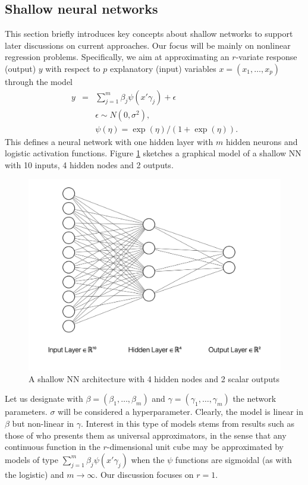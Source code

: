 \subsection{Shallow neural networks}
This section briefly introduces key concepts
about shallow networks to support later discussions on current approaches.
Our focus will be mainly on nonlinear regression 
problems. Specifically, we aim at approximating 
an $r$-variate response (output) $y$ with respect to $p$ explanatory 
(input) variables $x=(x_1,\ldots,x_p)$ through the 
model
\begin{eqnarray}\label{kantora}
  y         & = & \sum_{j=1}^m \beta_j \psi(x' \gamma_j) +
                    \epsilon %
                    \nonumber\\
              & & \epsilon \sim N(0,\sigma^2),
                  \nonumber \\
              & & \psi(\eta) = \exp(\eta)/(1+\exp(\eta)).
                  \end{eqnarray}
This defines a neural network with one hidden 
layer with $m$ hidden neurons and logistic 
activation functions.
Figure \ref{figuradkk1} sketches 
a graphical model of a shallow NN with 10 inputs, 4 hidden nodes and 
2 outputs. 
\begin{figure}
    \centering
    \includegraphics[scale=0.5]{figures/net1.png}
    \caption{A shallow NN architecture with 4 hidden nodes and 2 scalar outputs}
    \label{figuradkk1}
\end{figure}

Let us designate with $\beta=(\beta_1,\ldots,\beta_m)$ and $\gamma=(\gamma_1,\ldots,\gamma_m)$ the network parameters. $\sigma$  
will be considered a hyperparameter. Clearly, the model
is linear in $\beta$ but non-linear in  
$\gamma$. Interest in this type of models stems from 
results such as those of \parencite{cybenko1989approximation}
who presents them as universal approximators,
in the sense that any continuous function in the 
$r$-dimensional unit cube 
may be approximated by models of type
$\sum_{j=1}^m \beta_j \psi(x' \gamma_j)$
when the $\psi$
functions are sigmoidal (as with the logistic) and
$m\rightarrow \infty$. Our discussion focuses on $r=1$.




